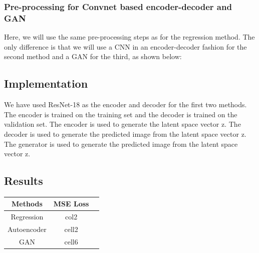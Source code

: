 \documentclass{article}
\begin{document}
\subsubsection{Pre-processing for Convnet based encoder-decoder and GAN}
Here, we will use the same pre-processing steps as for the regression method. 
The only difference is that we will use a CNN in an encoder-decoder fashion for the second method and a GAN for the third, as shown below:

\subsection{Implementation}
We have used ResNet-18 as the encoder and decoder for the first two methods. 
The encoder is trained on the training set and the decoder is trained on the validation set.
The encoder is used to generate the latent space vector z.
The decoder is used to generate the predicted image from the latent space vector z.
The generator is used to generate the predicted image from the latent space vector z.

\subsection{Results}

\begin{center}
\begin{tabular}{ |c |c|c| } 
\hline
\textbf{Methods} & \textbf{MSE Loss}\\
\hline
Regression & col2 \\
\hline
Autoencoder & cell2   \\ 
\hline
GAN & cell6  \\ 
\hline
\end{tabular}
\end{center}
\end{document}
